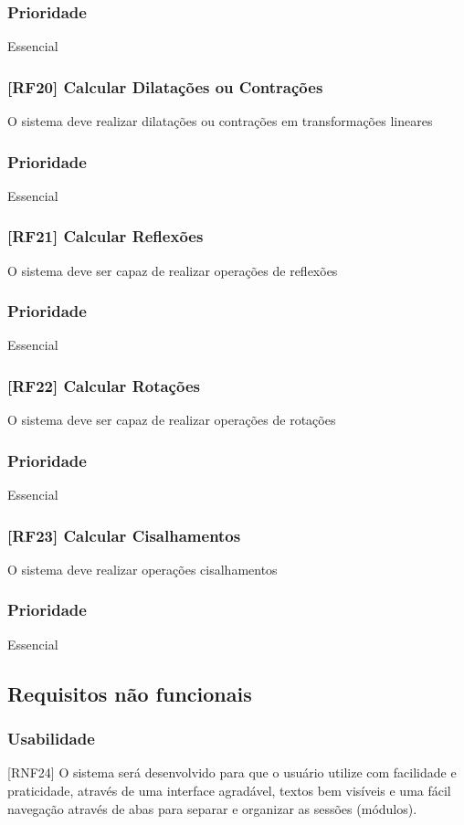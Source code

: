 \documentclass{scrreprt}
\begin{document}
\subsubsection{Prioridade}
Essencial

\subsubsection{[RF20] Calcular Dilatações ou Contrações }
O sistema deve realizar dilatações ou contrações em transformações lineares
\subsubsection{Prioridade}
Essencial

\subsubsection{[RF21] Calcular Reflexões}
O sistema deve ser capaz de realizar operações de reflexões
\subsubsection{Prioridade}
Essencial

\subsubsection{[RF22] Calcular Rotações }
O sistema deve ser capaz de realizar operações de rotações
\subsubsection{Prioridade}
Essencial

\subsubsection{[RF23] Calcular Cisalhamentos }
O sistema deve realizar operações cisalhamentos
\subsubsection{Prioridade}
Essencial


\subsection{Requisitos não funcionais}

\subsubsection{Usabilidade}
[RNF24] O sistema será desenvolvido para que o usuário utilize com facilidade e praticidade, através de uma interface agradável, textos bem visíveis e uma fácil navegação através de abas para separar e organizar as sessões (módulos). 
\end{document}
